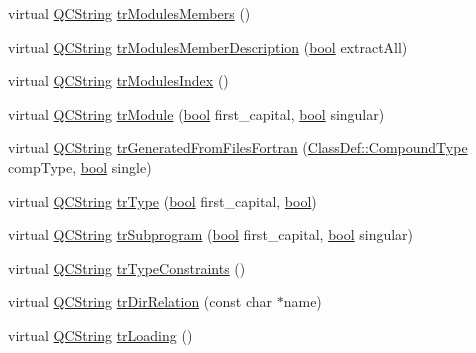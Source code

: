 \begin{DoxyCompactItemize}
\item 
virtual \hyperlink{class_q_c_string}{Q\+C\+String} \hyperlink{class_translator_catalan_abf1a10749bae3892aa7ce52038a3a3e4}{tr\+Modules\+Members} ()
\item 
virtual \hyperlink{class_q_c_string}{Q\+C\+String} \hyperlink{class_translator_catalan_a19b3cfcc327ef2357a72f0abf8226c4d}{tr\+Modules\+Member\+Description} (\hyperlink{qglobal_8h_a1062901a7428fdd9c7f180f5e01ea056}{bool} extract\+All)
\item 
virtual \hyperlink{class_q_c_string}{Q\+C\+String} \hyperlink{class_translator_catalan_a4540a8e9edb985cec7da2f40fd50af83}{tr\+Modules\+Index} ()
\item 
virtual \hyperlink{class_q_c_string}{Q\+C\+String} \hyperlink{class_translator_catalan_aa7917b53eb558afead346792fcd3f071}{tr\+Module} (\hyperlink{qglobal_8h_a1062901a7428fdd9c7f180f5e01ea056}{bool} first\+\_\+capital, \hyperlink{qglobal_8h_a1062901a7428fdd9c7f180f5e01ea056}{bool} singular)
\item 
virtual \hyperlink{class_q_c_string}{Q\+C\+String} \hyperlink{class_translator_catalan_a02f372d3c14b138b96a6db845cd1d3d0}{tr\+Generated\+From\+Files\+Fortran} (\hyperlink{class_class_def_ae70cf86d35fe954a94c566fbcfc87939}{Class\+Def\+::\+Compound\+Type} comp\+Type, \hyperlink{qglobal_8h_a1062901a7428fdd9c7f180f5e01ea056}{bool} single)
\item 
virtual \hyperlink{class_q_c_string}{Q\+C\+String} \hyperlink{class_translator_catalan_a93e4888110b95d9f1a3f0fee4f2937c0}{tr\+Type} (\hyperlink{qglobal_8h_a1062901a7428fdd9c7f180f5e01ea056}{bool} first\+\_\+capital, \hyperlink{qglobal_8h_a1062901a7428fdd9c7f180f5e01ea056}{bool})
\item 
virtual \hyperlink{class_q_c_string}{Q\+C\+String} \hyperlink{class_translator_catalan_a328ad6fb8c14c14f8501ce06b092d22d}{tr\+Subprogram} (\hyperlink{qglobal_8h_a1062901a7428fdd9c7f180f5e01ea056}{bool} first\+\_\+capital, \hyperlink{qglobal_8h_a1062901a7428fdd9c7f180f5e01ea056}{bool} singular)
\item 
virtual \hyperlink{class_q_c_string}{Q\+C\+String} \hyperlink{class_translator_catalan_a6078622afd8bd3ed53d20254b849a311}{tr\+Type\+Constraints} ()
\item 
virtual \hyperlink{class_q_c_string}{Q\+C\+String} \hyperlink{class_translator_catalan_a4816d9fd00b451a7f8b12dbca18968b8}{tr\+Dir\+Relation} (const char $\ast$name)
\item 
virtual \hyperlink{class_q_c_string}{Q\+C\+String} \hyperlink{class_translator_catalan_adec9f771b481b77eb110ceeccd702811}{tr\+Loading} ()

\end{DoxyCompactItemize}
